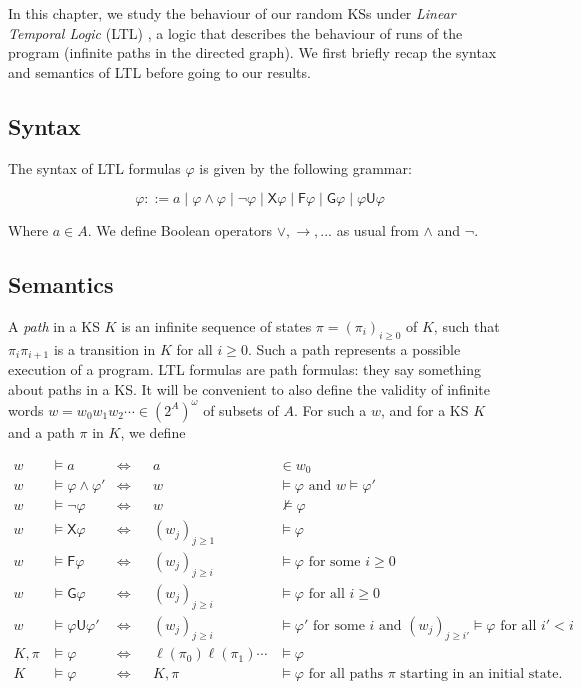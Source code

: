 \documentclass[runngingheads]{llncs}
\begin{document}
In this chapter, we study the behaviour of our random KSs under \emph{Linear Temporal Logic} (LTL) \cite{pnueli1977temporal}, a logic that describes the behaviour of runs of the program (infinite paths in the directed graph). We first briefly recap the syntax and semantics of LTL before going to our results.

\subsection{Syntax}

The syntax of LTL formulas $\varphi$ is given by the following grammar:

\[\varphi ::= a\mid \varphi \wedge \varphi \mid \neg \varphi \mid \mathsf{X} \varphi\mid \mathsf{F}\varphi \mid \mathsf{G} \varphi \mid \varphi \mathsf{U}\varphi\]

Where $a \in A$. We define Boolean operators $\vee,\rightarrow,...$ as usual from $\wedge$ and $\neg$.

\subsection{Semantics}

A \emph{path} in a KS $K$ is an infinite sequence of states $\pi = (\pi_i)_{i \geq 0}$ of $K$,  such that $\pi_i\pi_{i+1}$ is a transition in $K$ for all $i \geq 0$. Such a path represents a possible execution of a program. LTL formulas are path formulas: they say something about paths in a KS. It will be convenient to also define the validity of infinite words $w = w_0w_1w_2\cdots \in (2^A)^{\omega}$ of subsets of $A$. For such a $w$, and for a KS $K$ and a path $\pi$ in $K$, we define

\begin{align*}
w &\models a &\Leftrightarrow&& a &\in w_0\\
w &\models \varphi \wedge \varphi' &\Leftrightarrow&& w &\models \varphi \textrm{ and } w \models \varphi'\\
w &\models \neg \varphi &\Leftrightarrow&& w &\not \models \varphi\\
w &\models \mathsf{X} \varphi &\Leftrightarrow&& (w_j)_{j \geq 1} &\models \varphi\\
w &\models \mathsf{F} \varphi &\Leftrightarrow&& (w_j)_{j \geq i} &\models \varphi \textrm{ for some $i \geq 0$}\\
w &\models \mathsf{G} \varphi &\Leftrightarrow&&  (w_j)_{j \geq i} &\models \varphi \textrm{ for all $i \geq 0$}\\
w &\models \varphi \mathsf{U} \varphi' &\Leftrightarrow&& (w_j)_{j \geq i} &\models \varphi' \textrm{ for some $i$ and } (w_j)_{j \geq i'} \models \varphi \textrm{ for all $i' < i$}\\
K,\pi &\models \varphi & \Leftrightarrow&& \ell(\pi_0)\ell(\pi_1)\cdots &\models \varphi\\
K &\models \varphi & \Leftrightarrow&& K,\pi &\models \varphi \textrm{ for all paths $\pi$ starting in an initial state.}
\end{align*}
\end{document}
